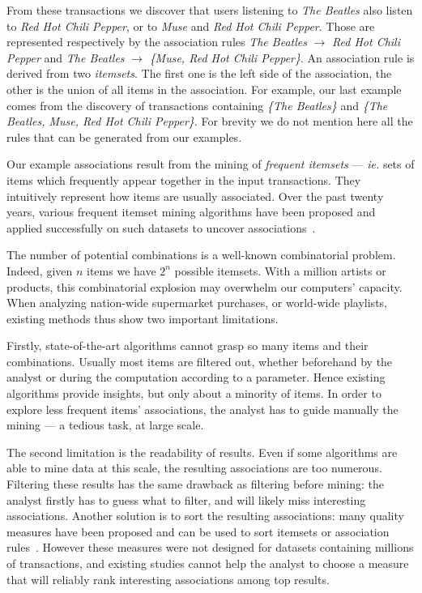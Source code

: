 From these transactions we discover that users listening to {\em The Beatles}
also listen to {\em Red Hot Chili Pepper}, or to {\em Muse} and {\em Red Hot Chili Pepper}.
Those are represented respectively by the association rules
{\em The Beatles} $\rightarrow$ {\em Red Hot Chili Pepper}
and
{\em The Beatles} $\rightarrow$ {\em \{Muse, Red Hot Chili Pepper\}}.
An association rule is derived from two {\em itemsets}.
The first one is the left side of the association,
the other is the union of all items in the association.
For example, our last example comes from the discovery of transactions
containing {\em \{The Beatles\}} and {\em \{The Beatles, Muse, Red Hot Chili Pepper\}}.
For brevity we do not mention here all the rules that can be generated from our examples.

Our example associations result from the mining of {\em frequent itemsets} --- {\em ie.}
sets of items which frequently appear together in the input transactions.
They intuitively represent how items are usually associated.
Over the past twenty years,
various frequent itemset mining algorithms have been proposed
and applied successfully on such datasets to uncover associations~\cite{CeglarACM2006}.

The number of potential combinations is a well-known combinatorial problem. %
Indeed, given $n$ items we have $2^n$ possible itemsets.
With a million artists or products,
this combinatorial explosion may overwhelm our computers' capacity.
When analyzing nation-wide supermarket purchases,
or world-wide playlists,
existing methods thus show two important limitations.

Firstly, state-of-the-art algorithms cannot grasp so many items and their combinations.
Usually most items are filtered out,
whether beforehand by the analyst
or during the computation according to a parameter.
Hence existing algorithms provide insights, but only about a minority of items.
In order to explore less frequent items' associations,
the analyst has to guide manually  the mining
--- a tedious task, at large scale.

The second limitation is the readability of results.
Even if some algorithms are able to mine data at this scale,
the resulting associations are too numerous.
Filtering these results has the same drawback as filtering before mining:
the analyst firstly has to guess what to filter, and will likely miss interesting associations.
Another solution is to sort the resulting associations:
many quality measures have been proposed and can be used to sort itemsets or association rules~\cite{GengACM06,Lenca2007}.
However these measures were not designed for datasets containing millions of transactions,
and existing studies cannot help the analyst to choose a measure
that will reliably rank interesting associations among top results.

